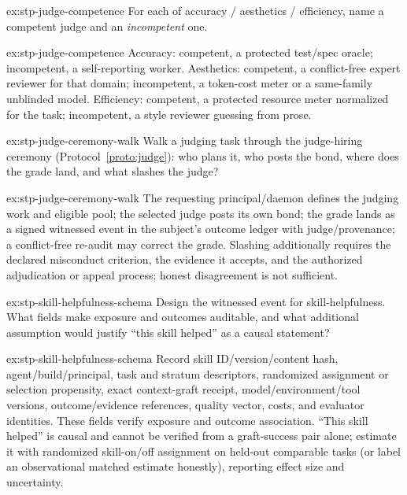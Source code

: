 \documentclass[11pt,a4paper]{article}
\theoremstyle{definition}
\newcounter{protocol}[section]
\begin{document}

\begin{pdexercise}[kind=Check,rating=1]{ex:stp-judge-competence}
For each of accuracy / aesthetics / efficiency, name a competent judge and an
\emph{incompetent} one.
\end{pdexercise}
\begin{pdsolution}{ex:stp-judge-competence}
Accuracy: competent, a protected test/spec oracle; incompetent, a
self-reporting worker. Aesthetics: competent, a conflict-free expert reviewer
for that domain; incompetent, a token-cost meter or a same-family unblinded
model. Efficiency: competent, a protected resource meter normalized for the
task; incompetent, a style reviewer guessing from prose.
\end{pdsolution}
\begin{pdexercise}[kind=Trace,rating=2]{ex:stp-judge-ceremony-walk}
Walk a judging task through the judge-hiring ceremony
(Protocol~\ref{proto:judge}): who plans it, who posts the bond, where does
the grade land, and what slashes the judge?
\end{pdexercise}
\begin{pdsolution}{ex:stp-judge-ceremony-walk}
The requesting principal/daemon defines the judging work and eligible pool;
the selected judge posts its own bond; the grade lands as a signed witnessed
event in the subject's outcome ledger with judge/provenance; a conflict-free
re-audit may correct the grade. Slashing additionally requires the declared
misconduct criterion, the evidence it accepts, and the authorized adjudication
or appeal process; honest disagreement is not sufficient.
\end{pdsolution}
\begin{pdexercise}[kind=Trace,rating=2]{ex:stp-skill-helpfulness-schema}
Design the witnessed event for skill-helpfulness. What fields make exposure and outcomes auditable, and what additional
assumption would justify ``this skill helped'' as a causal statement?
\end{pdexercise}
\begin{pdsolution}{ex:stp-skill-helpfulness-schema}
Record skill ID/version/content hash, agent/build/principal, task and
stratum descriptors, randomized assignment or selection propensity, exact
context-graft receipt, model/environment/tool versions, outcome/evidence
references, quality vector, costs, and evaluator identities. These fields
verify exposure and outcome association. ``This skill helped'' is causal and
cannot be verified from a graft-success pair alone; estimate it with
randomized skill-on/off assignment on held-out comparable tasks (or label an
observational matched estimate honestly), reporting effect size and
uncertainty.
\end{pdsolution}
\end{document}
